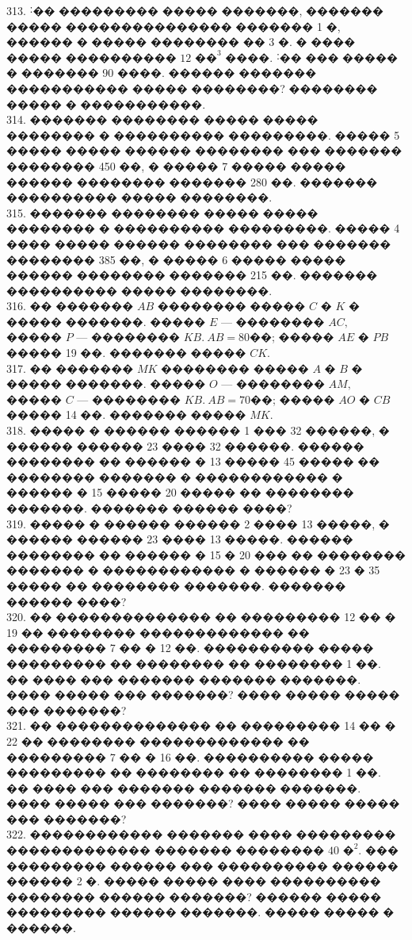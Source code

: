 \documentclass[12pt]{article}
\begin{document}
313. ˸�� ��������� ����� �������, ������� ����� ��������������� ������� 1 �, ������ � ����� �������� �� 3 �. � ���� ����� ���������� $12\text{ ��}^3$ ����. ˸�� ��� ����� � ������� 90 ����. ������ ������� ����������� ����� ��������? �������� ����� � �����������.\\
314. ������� �������� ����� ����� �������� � ���������� ���������. ����� 5 ����� ����� ������ �������� ��� ������� �������� 450 ��, � ����� 7 ����� ����� ������ �������� ������� 280 ��. ������� ���������� ����� ��������.\\
315. ������� �������� ����� ����� �������� � ���������� ���������. ����� 4 ���� ����� ������ �������� ��� ������� �������� 385 ��, � ����� 6 ����� ����� ������ �������� ������� 215 ��. ������� ���������� ����� ��������.\\
316. �� ������� $AB$ �������� ����� $C$ � $K$ � ����� �������. ����� $E$ --- �������� $AC,$ ����� $P$ --- �������� $KB.\ AB = 80$��; ����� $AE$ � $PB$ ����� 19 ��. ������� ����� $CK.$\\
317. �� ������� $MK$ �������� ����� $A$ � $B$ � ����� �������. ����� $O$ --- �������� $AM,$ ����� $C$ --- �������� $KB.\ AB = 70$��; ����� $AO$ � $CB$ ����� 14 ��. ������� ����� $MK.$\\
318. ����� � ������ ������ 1 ��� 32 ������, � ������ ������ 23 ���� 32 ������. ������ �������� �� ������ � 13 ����� 45 ����� �� �������� ������� � ������������ �
������ � 15 ����� 20 ����� �� �������� �������. ������� ������ ����?\\
319. ����� � ������ ������ 2 ���� 13 �����, � ������ ������ 23 ���� 13 �����. ������ �������� �� ������ � 15 � 20 ��� �� �������� ������� � ������������ � ������ �
23 � 35 ����� �� �������� �������. ������� ������ ����?\\
320. �� �������������� �� ��������� 12 �� � 19 �� �������� ������������� �� ��������� 7 �� � 12 ��. ���������� ����� ��������� �� �������� �� �������� 1 ��. �� ���� ��� ������� ������� �������. ���� ����� ��� �������? ���� ����� ����� ��� �������?\\
321. �� �������������� �� ��������� 14 �� � 22 �� �������� ������������� �� ���������
7 �� � 16 ��. ���������� ����� ��������� �� �������� �� �������� 1 ��. �� ���� ��� ������� ������� �������. ���� ����� ��� �������? ���� ����� ����� ��� �������?\\
322. ������������ ������� ���� ��������� ������������� ������� �������� $40\text{ �}^2.$ ��� ��������� ������ ��� ���������� ������ ������ 2 �. ����� ����� ����
���������� �������� ������ �������? ������ ����� ��������� ������ �������. ����� ����� � ������.\\
\end{document}
